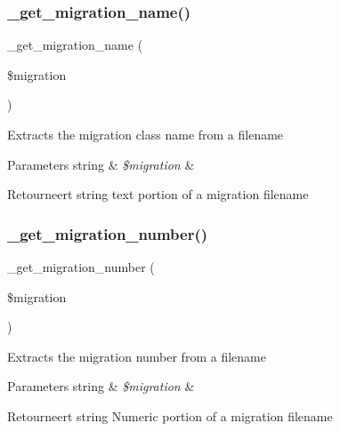 \subsubsection{\texorpdfstring{\_get\_migration\_name()}{\_get\_migration\_name()}}
{\footnotesize\ttfamily \+\_\+get\+\_\+migration\+\_\+name (\begin{DoxyParamCaption}\item[{}]{\$migration }\end{DoxyParamCaption})\hspace{0.3cm}{\ttfamily [protected]}}

Extracts the migration class name from a filename


\begin{DoxyParams}[1]{Parameters}
string & {\em \$migration} & \\
\hline
\end{DoxyParams}
\begin{DoxyReturn}{Retourneert}
string text portion of a migration filename 
\end{DoxyReturn}
\mbox{\label{class_c_i___migration_a79102ae684cc42b629c3cff885850c81}} 
\subsubsection{\texorpdfstring{\_get\_migration\_number()}{\_get\_migration\_number()}}
{\footnotesize\ttfamily \+\_\+get\+\_\+migration\+\_\+number (\begin{DoxyParamCaption}\item[{}]{\$migration }\end{DoxyParamCaption})\hspace{0.3cm}{\ttfamily [protected]}}

Extracts the migration number from a filename


\begin{DoxyParams}[1]{Parameters}
string & {\em \$migration} & \\
\hline
\end{DoxyParams}
\begin{DoxyReturn}{Retourneert}
string Numeric portion of a migration filename 
\end{DoxyReturn}
\mbox{\label{class_c_i___migration_a1de42592aaef750bc3782e873b1b6d5f}} 
